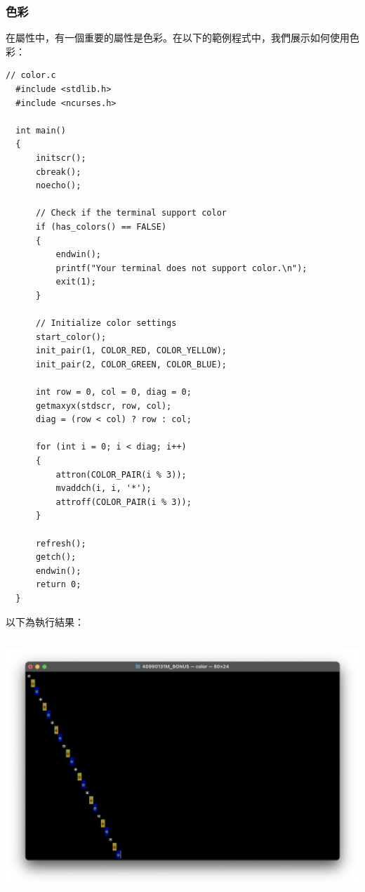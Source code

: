 \documentclass[12pt]{article}
\theoremstyle{definition}
\begin{document}
\subsubsection{色彩}
\noindent
在屬性中，有一個重要的屬性是色彩。在以下的範例程式中，我們展示如何使用色彩：
\begin{lstlisting}[style=C]
  // color.c
  #include <stdlib.h>
  #include <ncurses.h>

  int main()
  {
      initscr();
      cbreak();
      noecho();
    
      // Check if the terminal support color
      if (has_colors() == FALSE)
      {
          endwin();
          printf("Your terminal does not support color.\n");
          exit(1);
      }
    
      // Initialize color settings
      start_color();
      init_pair(1, COLOR_RED, COLOR_YELLOW);
      init_pair(2, COLOR_GREEN, COLOR_BLUE);
    
      int row = 0, col = 0, diag = 0;
      getmaxyx(stdscr, row, col);
      diag = (row < col) ? row : col;
    
      for (int i = 0; i < diag; i++)
      {
          attron(COLOR_PAIR(i % 3));
          mvaddch(i, i, '*');
          attroff(COLOR_PAIR(i % 3));
      }
    
      refresh();
      getch();
      endwin();
      return 0;
  }
\end{lstlisting}
以下為執行結果：
\begin{lstlisting}[style=zsh]
  % ./color
\end{lstlisting}
\begin{center}
    \includegraphics[width=\textwidth]{color.png}
\end{center}
\end{document}
